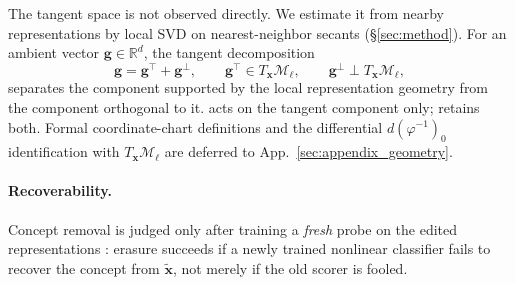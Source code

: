 The tangent space is not observed directly. We estimate it from nearby representations by local SVD
on nearest-neighbor secants (§\ref{sec:method}). For an ambient vector
$\mathbf{g} \in \mathbb{R}^d$, the tangent decomposition
\begin{equation}
    \mathbf{g}
    =
    \mathbf{g}^{\top}
    +
    \mathbf{g}^{\perp},
    \qquad
    \mathbf{g}^{\top} \in T_{\mathbf{x}}\mathcal{M}_\ell,
    \qquad
    \mathbf{g}^{\perp} \perp T_{\mathbf{x}}\mathcal{M}_\ell,
\end{equation}
separates the component supported by the local representation geometry from the component
orthogonal to it. \TanGCE{} acts on the tangent component only; \AmbGCEpp{} retains both. Formal
coordinate-chart definitions and the differential $d(\varphi^{-1})_0$ identification with
$T_{\mathbf{x}}\mathcal{M}_\ell$ are deferred to App.~\ref{sec:appendix_geometry}.

\paragraph{Recoverability.}
Concept removal is judged only after training a \emph{fresh} probe on the edited representations
\citep{elazar-goldberg-2018-adversarial}: erasure succeeds if a newly trained nonlinear classifier
fails to recover the concept from $\tilde{\mathbf{x}}$, not merely if the old scorer is fooled.